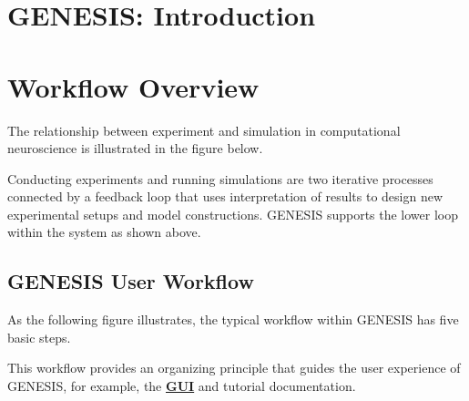 \documentclass[12pt]{article}
\begin{document}
\section*{GENESIS: Introduction}

\section*{Workflow Overview}

The relationship between experiment and simulation in computational neuroscience is illustrated in the figure below.  


Conducting experiments and running simulations are two iterative processes connected by a feedback loop that uses interpretation of results to design new experimental setups and model constructions. GENESIS supports the lower loop within the system as shown above.

\subsection*{GENESIS User Workflow}

As the following figure illustrates, the typical workflow within GENESIS has five basic steps. 

This workflow provides an organizing principle that guides the user experience of GENESIS, for example, the \href{../gui/gui.tex}{\bf GUI} and tutorial documentation.
\end{document}
